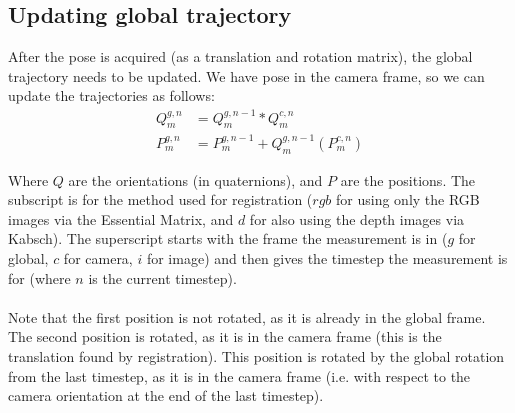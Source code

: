 \documentclass[12pt,a4paper]{article}
\begin{document}
\subsection{Updating global trajectory}
After the pose is acquired (as a translation and rotation matrix), the global trajectory needs to be updated. We have pose in the camera frame, so we can update the trajectories as follows:
\begin{align*}
Q_{m}^{g,n} &= Q_{m}^{g,n-1} * Q_{m}^{c,n} \\
P_{m}^{g,n} &= P_{m}^{g,n-1} + Q_{m}^{g,n-1}(P_{m}^{c,n})
\end{align*}

\noindent
Where $Q$ are the orientations (in quaternions), and $P$ are the positions. The subscript is for the method used for registration ($rgb$ for using only the RGB images via the Essential Matrix, and $d$ for also using the depth images via Kabsch). The superscript starts with the frame the measurement is in ($g$ for global, $c$ for camera, $i$ for image) and then gives the timestep the measurement is for (where $n$ is the current timestep).
\\\\
Note that the first position is not rotated, as it is already in the global frame. The second position is rotated, as it is in the camera frame (this is the translation found by registration). This position is rotated by the global rotation from the last timestep, as it is in the camera frame (i.e. with respect to the camera orientation at the end of the last timestep).
\end{document}
